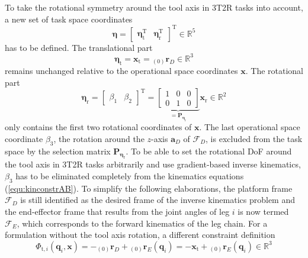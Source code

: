 \documentclass[robotics,article,submit,moreauthors,pdftex]{Definitions/mdpi}
\newcommand{\bm}[1]{\boldsymbol{#1}}
\newcommand{\ortvek}[4]{{ }_{(#1)}{\boldsymbol{#2}}^{#3}_{#4} }
\newcommand{\transp}[0]{{\mathrm{T}}}
\newcommand{\ks}[1]{{\mathcal{F}}_{#1}}
\let\Phi\varPhi
\begin{document}
To take the rotational symmetry around the tool axis in 3T2R tasks into account, a new set of task space coordinates
%
\begin{equation}
\bm{\eta}
=
\begin{bmatrix}
\bm{\eta}_{\mathrm{t}}^\transp & 
\bm{\eta}_{\mathrm{r}}^\transp
\end{bmatrix}^\transp
\in {\mathbb{R}}^{5}
\end{equation}  
%
has to be defined.
%
The translational part
%
\begin{equation}
\bm{\eta}_{\mathrm{t}}
=
\bm{x}_{\mathrm{t}}
=
\ortvek{0}{r}{}{D}
\in {\mathbb{R}}^{3}
\end{equation}  
%
remains unchanged relative to the operational space coordinates $\bm{x}$.
The rotational part
%
\begin{equation}
\bm{\eta}_{\mathrm{r}}
=
\begin{bmatrix}
\beta_1  & \beta_2
\end{bmatrix}^\transp
=
\underbrace{\begin{bmatrix}
    1 & 0 & 0  \\ 
    0 & 1 & 0    \end{bmatrix}}_{=\bm{P}_{\bm{\eta}_\mathrm{r}}}
\bm{x}_{\mathrm{r}}
\in {\mathbb{R}}^{2}
\label{equ:etar_def}
\end{equation}
%
only contains the first two rotational coordinates of $\bm{x}$.
The last operational space coordinate $\beta_3$, the rotation around the $z$-axis $\bm{a}_{D}$ of $\ks{D}$, is excluded from the task space by the selection matrix $\bm{P}_{\bm{\eta}_\mathrm{r}}$.
To be able to set the rotational DoF around the tool axis in 3T2R tasks arbitrarily and use gradient-based inverse kinematics, $\beta_3$ has to be eliminated completely from the kinematics equations (\ref{equ:kinconstrAB}).
%
%
To simplify the following elaborations, the platform frame $\ks{D}$ is still identified as the desired frame of the inverse kinematics problem and the end-effector frame that results from the joint angles of leg $i$ is now termed $\ks{E}$, which corresponds to the forward kinematics of the leg chain.
%
For a formulation without the tool axis rotation, a different constraint definition
%
\begin{equation}
\bm{\Phi}_{\mathrm{t},i}(\bm{q}_i,\bm{x})
= 
- \ortvek{0}{r}{}{D} + \ortvek{0}{r}{}{E}(\bm{q}_i)
=
- \bm{x}_{\mathrm{t}} + \ortvek{0}{r}{}{E}(\bm{q}_i) \in {\mathbb{R}}^{3}
\label{equ:Phit_def_i}
\end{equation}
\end{document}
